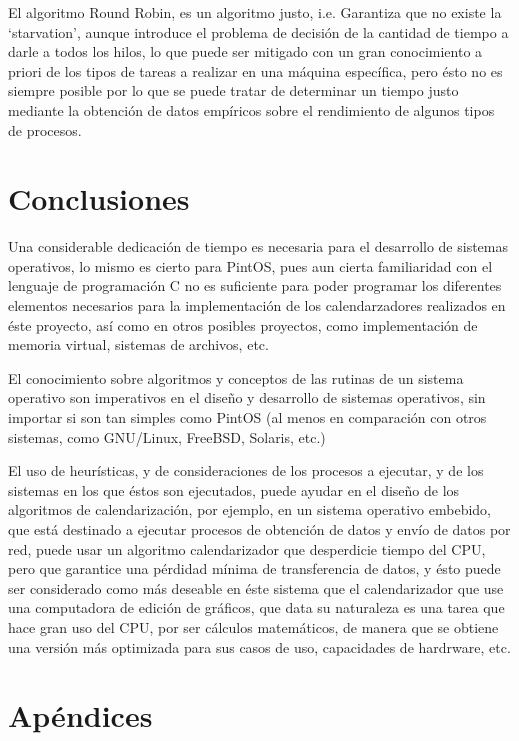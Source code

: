 \documentclass[letterpaper,journal,12pt]{IEEEtran}
\begin{document}
El algoritmo Round Robin, es un algoritmo justo, i.e. Garantiza que no existe la `starvation', aunque introduce el problema de decisión de la cantidad de tiempo a darle a todos los hilos, lo que puede ser mitigado con un gran conocimiento a priori de
los tipos de tareas a realizar en una máquina específica, pero ésto no es siempre posible
por lo que se puede tratar de determinar un tiempo justo mediante la obtención de datos
empíricos sobre el rendimiento de algunos tipos de procesos.

\section{Conclusiones}

Una considerable dedicación de tiempo es necesaria para el desarrollo de sistemas operativos, lo mismo es cierto para PintOS, pues aun cierta familiaridad con el
lenguaje de programación C no es suficiente para poder programar los diferentes
elementos necesarios para la implementación de los calendarzadores realizados en éste
proyecto, así como en otros posibles proyectos, como implementación de memoria virtual,
sistemas de archivos, etc.

El conocimiento sobre algoritmos y conceptos de las rutinas de un sistema operativo
son imperativos en el diseño y desarrollo de sistemas operativos, sin importar
si son tan simples como PintOS (al menos en comparación con otros sistemas, como GNU/Linux, FreeBSD, Solaris, etc.)

El uso de heurísticas, y de consideraciones de los procesos a ejecutar, y de los sistemas en los que éstos son ejecutados, puede ayudar en el diseño de los algoritmos de calendarización, por ejemplo, en un sistema operativo embebido, que está destinado a ejecutar procesos de obtención de datos y envío de datos por red, puede usar un algoritmo calendarizador que desperdicie tiempo del CPU, pero que garantice una pérdidad mínima de transferencia de datos, y ésto puede ser considerado como más deseable en éste sistema que el calendarizador que use una computadora de edición de gráficos, que data su naturaleza es una tarea que hace gran uso del CPU, por ser cálculos matemáticos, de manera que se obtiene una versión más optimizada para sus casos de uso, capacidades de hardrware, etc.

\section{Apéndices}
\end{document}
